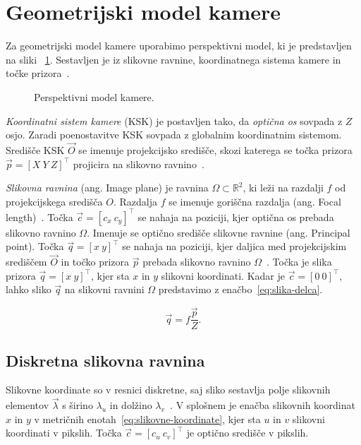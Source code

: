 \section{Geometrijski model kamere}\label{sec:model-kamere}
Za geometrijski model kamere uporabimo perspektivni model, ki je predstavljen na sliki            ~\ref{fig:perspektivni-model}. Sestavljen je iz slikovne ravnine, koordinatnega sistema kamere in točke prizora~\cite{trucco1998introductory}.


\begin{figure}[htb]
\centering

\caption[Perspektivni model kamere]{Perspektivni model kamere.}
\label{fig:perspektivni-model}
\end{figure}


\emph{Koordinatni sistem kamere} (KSK) je postavljen tako, da \emph{optična os} sovpada z $Z$ osjo. Zaradi poenostavitve KSK sovpada z globalnim koordinatnim sistemom.  Središče KSK $\vec{O}$ se imenuje projekcijsko središče, skozi katerega se točka prizora $\vec{p} = \left[ X~Y~Z \right]^\top$ projicira na slikovno ravnino~\cite{trucco1998introductory}.

\emph{Slikovna ravnina} (ang. Image plane) je ravnina $\varOmega \subset \mathbb{R}^2$, ki leži na razdalji $f$ od projekcijskega središča $O$. Razdalja $f$ se imenuje goriščna razdalja (ang. Focal length)~\cite{trucco1998introductory}. Točka $\vec{c} = \left[c_x~c_y \right]^\top$ se nahaja na poziciji, kjer optična os prebada slikovno ravnino $\varOmega$. Imenuje se optično središče slikovne ravnine (ang. Principal point). Točka $\vec{q} = [x~y]^\top$ se nahaja na poziciji, kjer daljica med projekcijskim središčem $\vec{O}$ in točko prizora $\vec{p}$ prebada slikovno ravnino $\varOmega$~\cite{trucco1998introductory}. Točka je slika prizora $\vec{q} = [x~y]^\top$, kjer sta $x$ in $y$ slikovni koordinati. Kadar je $\vec{c} = \left[0~0\right]^\top$, lahko sliko $\vec{q}$ na slikovni ravnini $\varOmega$ predstavimo z enačbo~\eqref{eq:slika-delca}.

\begin{equation}
	\vec{q} = f \frac{\vec{p}}{Z}.
    \label{eq:slika-delca}
\end{equation}

\subsection{Diskretna slikovna ravnina}
Slikovne koordinate so v resnici diskretne, saj sliko sestavlja polje slikovnih elementov $\vec{\lambda}$ s širino $\lambda_u$ in dolžino $\lambda_v$~\cite{trucco1998introductory}. V splošnem je enačba slikovnih koordinat $x$ in $y$ v metričnih enotah~\eqref{eq:slikovne-koordinate}, kjer sta $u$ in $v$ slikovni koordinati v pikslih. Točka $\vec{c} = \left[c_u~c_v \right]^\top$ je optično središče v pikslih.

